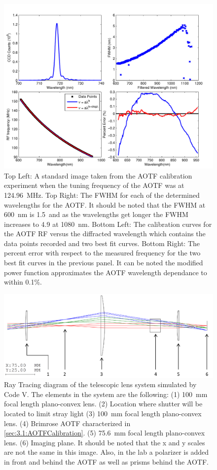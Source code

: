 \documentclass[11pt]{article}
\begin{document}
\begin{figure}[h!]
    \includegraphics[width=1.0\textwidth]{./Images/3-1-AOTFCharaterization.pdf}
    \caption[Characterization Curves for the Brimrose AOTF]{Top Left: A standard image taken from the AOTF calibration experiment when the tuning frequency of the AOTF was at 124.96~MHz. Top Right: The FWHM for each of the determined wavelengths for the AOTF. It should be noted that the FWHM at 600~nm is 1.5~and as the wavelengths get longer the FWHM increases to 4.9 at 1080~nm. Bottom Left: The calibration curves for the AOTF RF versus the  diffracted wavelength which contains the data points recorded and two best fit curves. Bottom Right: The percent error with respect to the measured frequency for the two best fit curves in the previous panel. It can be noted the modified power function approximates the AOTF wavelength dependance to within 0.1\%.}
    \label{fig:3.1:AOTFCharaterization}
\end{figure}

\begin{figure}[h!]
    \includegraphics[width=1.0\textwidth]{./Images/3-2-TelescopicRayTracing.pdf}
    \caption[ALI Telescopic Design Prototype]{Ray Tracing diagram of the telescopic lens system simulated by Code V. The elements in the system are the following: (1) 100~mm focal length plano-convex lens. (2) Location where shutter will be located to limit stray light (3) 100~mm focal length plano-convex lens. (4) Brimrose AOTF characterized in \autoref{sec:3.1:AOTFCalibration}. (5) 75.6~mm focal length plano-convex lens. (6) Imaging plane. It should be noted that the x and y scales are not the same in this image. Also, in the lab a polarizer is added in front and behind the AOTF as well as prisms behind the AOTF.}
    \label{fig:3.2:telescopicRayTracing}
\end{figure}
\end{document}
